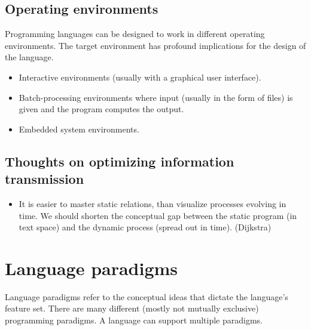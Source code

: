 \subsection{Operating environments}
Programming languages can be designed to work in different operating environments. The target environment has profound implications for the design of the language.
\begin{itemize}
\item Interactive environments (usually with a graphical user interface).
\item Batch-processing environments where input (usually in the form of files) is given and the program computes the output.
\item Embedded system environments.
\end{itemize}

\subsection{Thoughts on optimizing information transmission}
\begin{itemize}
\item It is easier to master static relations, than visualize processes evolving in time. We should shorten the conceptual gap between the static program (in text space) and the dynamic process (spread out in time). (Dijkstra)
\end{itemize}

\section{Language paradigms}
Language paradigms refer to the conceptual ideas that dictate the language's feature set. There are many different (mostly not mutually exclusive) programming paradigms. A language can support multiple paradigms.

